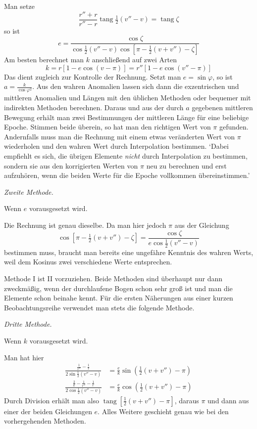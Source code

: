 Man setze
\[
\frac{r''+r}{r''-r}\operatorname{tang}\tfrac12(v''-v)=\operatorname{tang}\zeta
\]
so ist
\[
e=\frac{\cos\zeta}{\cos\tfrac12(v''-v)\cos[\pi-\tfrac12(v+v'')-\zeta]}
\]
Am besten berechnet man $k$ anschließend auf zwei Arten
\[
k=r[1-e\cos(v-\pi)]=r''[1-e\cos(v''-\pi)]
\]
Das dient zugleich zur Kontrolle der Rechnung. Setzt man $e=\sin\varphi$, so ist $a=\frac{k}{\cos\varphi^2}$. Aus den wahren Anomalien lassen sich dann die exzentrischen und mittleren Anomalien und Längen mit den üblichen Methoden oder bequemer mit indirekten Methoden berechnen. Daraus und aus der durch $a$ gegebenen mittleren Bewegung erhält man zwei Bestimmungen der mittleren Länge für eine beliebige Epoche. Stimmen beide überein, so hat man den richtigen Wert von $\pi$ gefunden. Andernfalls muss man die Rechnung mit einem etwas veränderten Wert von $\pi$ wiederholen und den wahren Wert durch Interpolation bestimmen. ‘Dabei empfiehlt es sich, die übrigen Elemente \emph{nicht} durch Interpolation zu bestimmen, sondern sie aus den korrigierten Werten von $\pi$ neu zu berechnen und erst aufzuhören, wenn die beiden Werte für die Epoche vollkommen übereinstimmen.’
%
\par\medskip\emph{Zweite Methode.}\par
Wenn $e$ vorausgesetzt wird.

Die Rechnung ist genau dieselbe. Da man hier jedoch $\pi$ aus der Gleichung
\[
\cos[\pi-\tfrac12(v+v'')-\zeta]=\frac{\cos\zeta}{e\cos\tfrac12(v''-v)}
\]
bestimmen muss, braucht man bereits eine ungefähre Kenntnis des wahren Werts, weil dem Kosinus zwei verschiedene Werte entsprechen.

Methode I ist II vorzuziehen. Beide Methoden sind überhaupt nur dann zweckmäßig, wenn der durchlaufene Bogen schon sehr groß ist und man die Elemente schon beinahe kennt. Für die ersten Näherungen aus einer kurzen Beobachtungsreihe verwendet man stets die folgende Methode.

\par\medskip\emph{Dritte Methode.}\par
Wenn $k$ vorausgesetzt wird.

Man hat hier
\[
\begin{aligned}
\frac{\frac1{r''}-\frac1r}{2\sin\tfrac12(v''-v)}&=\frac ek\sin(\tfrac12(v+v'')-\pi)\\
\frac{\frac2k-\frac1{r''}-\frac1r}{2\cos\tfrac12(v''-v)}&=\frac ek\cos(\tfrac12(v+v'')-\pi)
\end{aligned}
\]
Durch Division erhält man also $\operatorname{tang}[\tfrac12(v+v'')-\pi]$, daraus $\pi$ und dann aus einer der beiden Gleichungen $e$. Alles Weitere geschieht genau wie bei den vorhergehenden Methoden.

